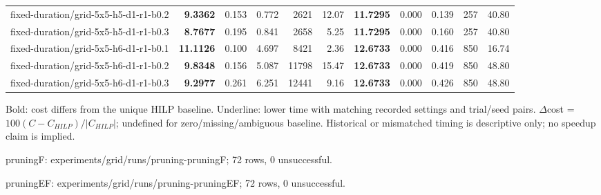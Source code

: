 \documentclass[10pt]{article}
\begin{document}
\begin{tabular}{p{65mm}rrrrrrrrrr}
fixed-\allowbreak duration/\allowbreak grid-\allowbreak 5x5-\allowbreak h5-\allowbreak d1-\allowbreak r1-\allowbreak b0.2 & \textbf{9.3362} & 0.153 & 0.772 & 2621 & 12.07 & \textbf{11.7295} & 0.000 & 0.139 & 257 & 40.80 \\
fixed-\allowbreak duration/\allowbreak grid-\allowbreak 5x5-\allowbreak h5-\allowbreak d1-\allowbreak r1-\allowbreak b0.3 & \textbf{8.7677} & 0.195 & 0.841 & 2658 & 5.25 & \textbf{11.7295} & 0.000 & 0.160 & 257 & 40.80 \\
fixed-\allowbreak duration/\allowbreak grid-\allowbreak 5x5-\allowbreak h6-\allowbreak d1-\allowbreak r1-\allowbreak b0.1 & \textbf{11.1126} & 0.100 & 4.697 & 8421 & 2.36 & \textbf{12.6733} & 0.000 & 0.416 & 850 & 16.74 \\
fixed-\allowbreak duration/\allowbreak grid-\allowbreak 5x5-\allowbreak h6-\allowbreak d1-\allowbreak r1-\allowbreak b0.2 & \textbf{9.8348} & 0.156 & 5.087 & 11798 & 15.47 & \textbf{12.6733} & 0.000 & 0.419 & 850 & 48.80 \\
fixed-\allowbreak duration/\allowbreak grid-\allowbreak 5x5-\allowbreak h6-\allowbreak d1-\allowbreak r1-\allowbreak b0.3 & \textbf{9.2977} & 0.261 & 6.251 & 12441 & 9.16 & \textbf{12.6733} & 0.000 & 0.426 & 850 & 48.80 \\
\bottomrule\end{tabular}\par
\medskip\footnotesize
Bold: cost differs from the unique HILP baseline. Underline: lower time with matching recorded settings and trial/seed pairs. $\Delta$cost = $100(C-C_{HILP})/|C_{HILP}|$; undefined for zero/missing/ambiguous baseline. Historical or mismatched timing is descriptive only; no speedup claim is implied.\par
pruningF: experiments/grid/runs/pruning-pruningF; 72 rows, 0 unsuccessful.\par
pruningEF: experiments/grid/runs/pruning-pruningEF; 72 rows, 0 unsuccessful.\par
\clearpage
\end{document}
